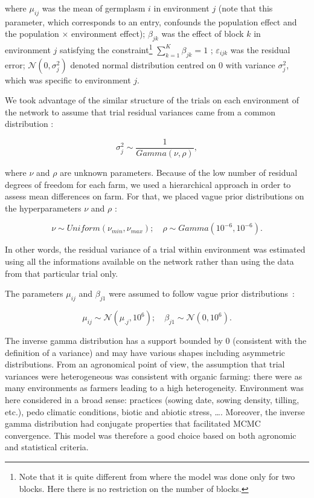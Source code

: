 \documentclass{book}\usepackage[]{graphicx}\usepackage[]{color}
\begin{document}
where
$\mu_{ij}$ was the mean of germplasm $i$ in environment $j$ (note that this parameter, which corresponds to an entry, confounds the population effect and the population $\times$ environment effect);
$\beta_{jk}$ was the effect of block $k$ in environment $j$ satisfying the constraint\footnote{Note that it is quite different from \citet{riviere_hierarchical_2015} where the model was done only for two blocks. Here there is no restriction on the number of blocks.} $\sum\limits_{k=1}^K \beta_{jk} = 1$ ;
$\varepsilon_{ijk}$ was the residual error;
$\mathcal{N} (0,\sigma^2_{j})$ denoted normal distribution centred on 0 with variance $\sigma^2_{j}$, which was specific to environment $j$.

We took advantage of the similar structure of the trials on each environment of the network to assume that trial residual variances came from a common distribution :

\begin{displaymath}
	\sigma^2_{j} \sim \frac{1}{Gamma(\nu,\rho)},
\end{displaymath}

where $\nu$ and $\rho$ are unknown parameters.
Because of the low number of residual degrees of freedom for each farm, we used a hierarchical approach in order to assess mean differences on farm.
For that, we placed vague prior distributions on the hyperparameters $\nu$ and $\rho$ :

\begin{displaymath}
	\nu \sim Uniform(\nu_{min},\nu_{max}) ; \quad \rho \sim Gamma(10^{-6},10^{-6}).
\end{displaymath}


In other words, the residual variance of a trial within environment was estimated using all the informations available on the network rather than using the data from that particular trial only.

The parameters $\mu_{ij}$ and $\beta_{j1}$ were assumed to follow vague prior distributions~:

\begin{displaymath}
	\mu_{ij} \sim \mathcal{N}(\mu_{.j},10^{6}); \quad \beta_{j1} \sim \mathcal{N}(0,10^{6}).
\end{displaymath}


The inverse gamma distribution has a support bounded by 0 (consistent with the definition of a variance) and may have various shapes including asymmetric distributions.
From an agronomical point of view, the assumption that trial variances were heterogeneous was consistent with organic farming: there were as many environments as farmers leading to a high heterogeneity.
Environment was here considered in a broad sense: practices (sowing date, sowing density, tilling, etc.), pedo climatic conditions, biotic and abiotic stress, \dots \citep{desclaux_changes_2008}.
Moreover, the inverse gamma distribution had conjugate properties that facilitated MCMC convergence.
This model was therefore a good choice based on both agronomic and statistical criteria.
\end{document}
